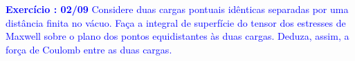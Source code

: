 \textcolor{blue}{\textbf{Exercício \paragraphnum: 02/09 }
	Considere duas cargas pontuais idênticas separadas por uma distância finita no vácuo. Faça a integral de superfície do tensor dos estresses de Maxwell sobre o plano dos pontos equidistantes às duas cargas. Deduza, assim, a força de Coulomb entre as duas cargas.}
\bigskip\\